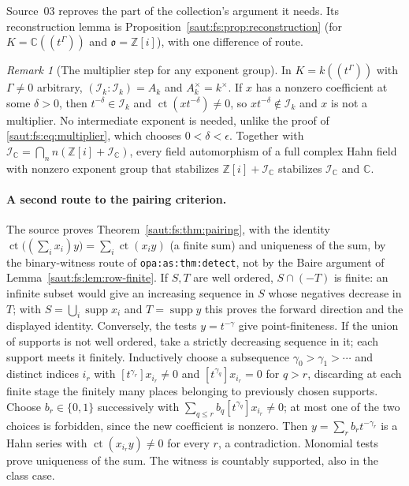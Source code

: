 \documentclass[11pt]{article}
\theoremstyle{definition}
\theoremstyle{remark}
\newtheorem{remark}[theorem]{Remark}
\newcommand{\C}{\mathbb C}
\newcommand{\Z}{\mathbb Z}
\newcommand{\supp}{\operatorname{supp}}
\newcommand{\lbl}[1]{\nolinkurl{#1}}%
\newcommand{\ct}{\operatorname{ct}}
\newcommand{\Ineg}{\mathcal I}
\numberwithin{equation}{section}
\begin{document}
Source~03 reproves the part of the collection's argument it needs. Its reconstruction
lemma is Proposition~\ref{saut:fs:prop:reconstruction} (for $K=\C((t^\Gamma))$ and
$\mathfrak o=\Z[i]$), with one difference of route.

\begin{remark}[The multiplier step for any exponent group]\label{saut:gr:rem:multiplier}
In $K=k((t^\Gamma))$ with $\Gamma\ne0$ arbitrary, $(\Ineg_k:\Ineg_k)=A_k$ and
$A_k^\times=k^\times$. If $x$ has a nonzero coefficient at some $\delta>0$, then
$t^{-\delta}\in\Ineg_k$ and $\ct(xt^{-\delta})\ne0$, so $x t^{-\delta}\notin\Ineg_k$ and
$x$ is not a multiplier. No intermediate exponent is needed, unlike the proof of
\eqref{saut:fs:eq:multiplier}, which chooses $0<\delta<\epsilon$. Together with
$\Ineg_\C=\bigcap_nn(\Z[i]+\Ineg_\C)$, every field automorphism of a full complex Hahn
field with nonzero exponent group that stabilizes $\Z[i]+\Ineg_\C$ stabilizes
$\Ineg_\C$ and $\C$.
\end{remark}

\paragraph{A second route to the pairing criterion.} The source proves
Theorem~\ref{saut:fs:thm:pairing}, with the identity
$\ct\bigl((\sum_ix_i)y\bigr)=\sum_i\ct(x_iy)$ (a finite sum) and uniqueness of the sum,
by the binary-witness route of \lbl{opa:as:thm:detect}, not by the Baire argument of
Lemma~\ref{saut:fs:lem:row-finite}. If $S,T$ are well ordered, $S\cap(-T)$ is finite:
an infinite subset would give an increasing sequence in $S$ whose negatives decrease
in $T$; with $S=\bigcup_i\supp x_i$ and $T=\supp y$ this proves the forward direction
and the displayed identity. Conversely, the tests $y=t^{-\gamma}$ give point-finiteness.
If the union of supports is not well ordered, take a strictly decreasing sequence in
it; each support meets it finitely. Inductively choose a subsequence
$\gamma_0>\gamma_1>\cdots$ and distinct indices $i_r$ with $[t^{\gamma_r}]x_{i_r}\ne0$
and $[t^{\gamma_q}]x_{i_r}=0$ for $q>r$, discarding at each finite stage the finitely
many places belonging to previously chosen supports. Choose $b_r\in\{0,1\}$
successively with $\sum_{q\le r}b_q[t^{\gamma_q}]x_{i_r}\ne0$; at most one of the two
choices is forbidden, since the new coefficient is nonzero. Then
$y=\sum_rb_rt^{-\gamma_r}$ is a Hahn series with $\ct(x_{i_r}y)\ne0$ for every $r$, a
contradiction. Monomial tests prove uniqueness of the sum. The witness is countably
supported, also in the class case.
\end{document}
